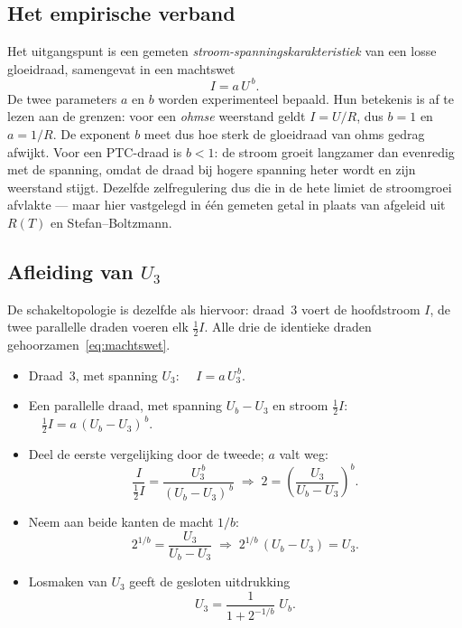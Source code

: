 \documentclass[addpoints,11pt,a4paper]{exam}
\begin{document}
\begin{questions}
\subsection*{Het empirische verband}

Het uitgangspunt is een gemeten \emph{stroom-spanningskarakteristiek} van
een losse gloeidraad, samengevat in een machtswet
\begin{equation}
I = a\,U^{\,b}.
\label{eq:machtswet}
\end{equation}
De twee parameters $a$ en $b$ worden experimenteel bepaald. Hun betekenis
is af te lezen aan de grenzen: voor een \emph{ohmse} weerstand geldt
$I = U/R$, dus $b = 1$ en $a = 1/R$. De exponent $b$ meet dus hoe sterk de
gloeidraad van ohms gedrag afwijkt. Voor een PTC-draad is $b < 1$: de
stroom groeit langzamer dan evenredig met de spanning, omdat de draad bij
hogere spanning heter wordt en zijn weerstand stijgt. Dezelfde
zelfregulering dus die in de hete limiet de stroomgroei afvlakte --- maar
hier vastgelegd in \'e\'en gemeten getal in plaats van afgeleid uit
$R(T)$ en Stefan--Boltzmann.

\subsection*{Afleiding van \texorpdfstring{$U_3$}{U3}}

De schakeltopologie is dezelfde als hiervoor: draad~3 voert de
hoofdstroom $I$, de twee parallelle draden voeren elk $\tfrac{1}{2}I$.
Alle drie de identieke draden gehoorzamen~\eqref{eq:machtswet}.

\begin{itemize}
  \item Draad~3, met spanning $U_3$: $\quad I = a\,U_3^{\,b}$.
  \item Een parallelle draad, met spanning $U_b - U_3$ en stroom
    $\tfrac{1}{2}I$: $\quad \tfrac{1}{2}I = a\,(U_b - U_3)^{\,b}$.
  \item Deel de eerste vergelijking door de tweede; $a$ valt weg:
    \[\frac{I}{\tfrac{1}{2}I}
       = \frac{U_3^{\,b}}{(U_b-U_3)^{\,b}}
       \;\Longrightarrow\;
       2 = \left(\frac{U_3}{U_b-U_3}\right)^{\!b}.\]
  \item Neem aan beide kanten de macht $1/b$:
    \[2^{1/b} = \frac{U_3}{U_b - U_3}
       \;\Longrightarrow\;
       2^{1/b}\,(U_b - U_3) = U_3.\]
  \item Losmaken van $U_3$ geeft de gesloten uitdrukking
    \[\boxed{\;U_3 = \dfrac{1}{1 + 2^{-1/b}}\;U_b.\;}\]
\end{itemize}


\end{questions}
\end{document}

